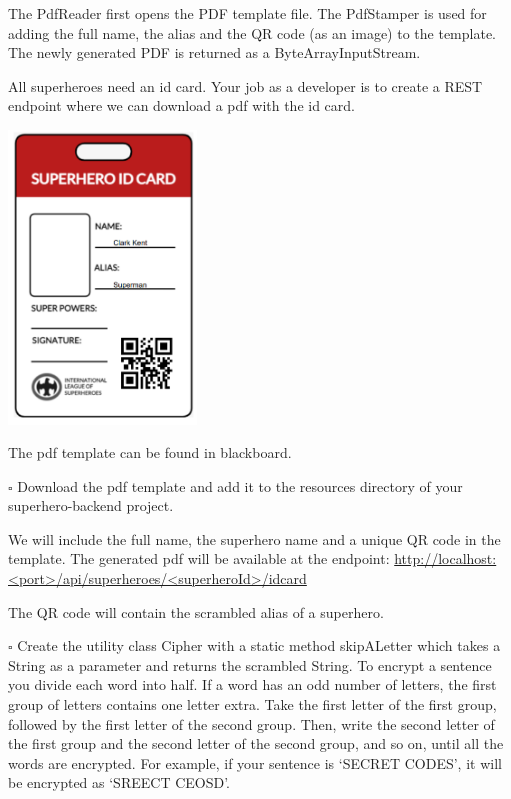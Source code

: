 The PdfReader first opens the PDF template file. The PdfStamper is used for adding the full name, the alias and the
QR code (as an image) to the template. The newly generated PDF is returned as a ByteArrayInputStream.

\begin{oefening}

All superheroes need an id card. Your job as a developer is to create a REST endpoint where we can download a pdf with the id card.

\includegraphics[width=5cm]{./images/chapter3/superhero_id_card.png}

The pdf template can be found in blackboard. 

$\square$ Download the pdf template and add it to the resources directory of your superhero-backend project.

\vspace{5mm}

We will include the full name, the superhero name and a unique QR code in the template.
The generated pdf will be available at the endpoint:
\url{http://localhost:<port>/api/superheroes/<superheroId>/idcard}

The QR code will contain the scrambled alias of a superhero. 

\vspace{5mm}

$\square$ Create the utility class Cipher with a static method skipALetter which takes a String as a parameter and returns the scrambled String. To encrypt a sentence you divide each word into half. If a word has an odd number of letters, the first group of letters contains one letter extra. Take the first letter of the first group, followed by the first letter of the second group. Then, write the second letter of the first group and the second letter of the second group, and so on, until all the words are encrypted. For example, if your sentence is `SECRET CODES', it will be encrypted as `SREECT CEOSD'.


\end{oefening}
